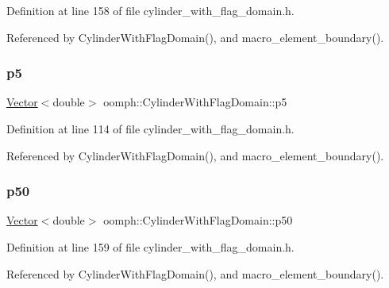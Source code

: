 Definition at line 158 of file cylinder\+\_\+with\+\_\+flag\+\_\+domain.\+h.



Referenced by Cylinder\+With\+Flag\+Domain(), and macro\+\_\+element\+\_\+boundary().

\mbox{\label{classoomph_1_1CylinderWithFlagDomain_ad4f4179e51afb966f11b999ef9ddd0a9}} 
\subsubsection{\texorpdfstring{p5}{p5}}
{\footnotesize\ttfamily \hyperlink{classoomph_1_1Vector}{Vector}$<$double$>$ oomph\+::\+Cylinder\+With\+Flag\+Domain\+::p5\hspace{0.3cm}{\ttfamily [private]}}



Definition at line 114 of file cylinder\+\_\+with\+\_\+flag\+\_\+domain.\+h.



Referenced by Cylinder\+With\+Flag\+Domain(), and macro\+\_\+element\+\_\+boundary().

\mbox{\label{classoomph_1_1CylinderWithFlagDomain_a0b46b0c29925ba405a04fda8b3ab9c06}} 
\subsubsection{\texorpdfstring{p50}{p50}}
{\footnotesize\ttfamily \hyperlink{classoomph_1_1Vector}{Vector}$<$double$>$ oomph\+::\+Cylinder\+With\+Flag\+Domain\+::p50\hspace{0.3cm}{\ttfamily [private]}}



Definition at line 159 of file cylinder\+\_\+with\+\_\+flag\+\_\+domain.\+h.



Referenced by Cylinder\+With\+Flag\+Domain(), and macro\+\_\+element\+\_\+boundary().

\mbox{\label{classoomph_1_1CylinderWithFlagDomain_a8af35f3606195d1bab1da58102b7fa15}} 
